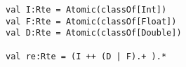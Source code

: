 \begin{lstlisting}[style=scalaioScala]
val I:Rte = Atomic(classOf[Int])
val F:Rte = Atomic(classOf[Float])
val D:Rte = Atomic(classOf[Double])

val re:Rte = (I ++ (D | F).+ ).*
\end{lstlisting}
